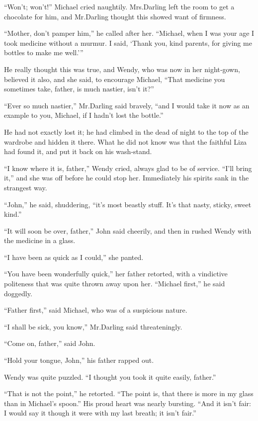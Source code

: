 “Won’t; won’t!\@” Michael cried naughtily.
Mrs.\@ Darling left the room to get a chocolate for him,
and Mr.\@ Darling thought this showed want of firmness.

“Mother, don’t pamper him,” he called after her.
“Michael, when I was your age I took medicine without a murmur.
I said, ‘Thank you, kind parents, for giving me bottles to make me well.’”

He really thought this was true,
and Wendy, who was now in her night‐gown, believed it also,
and she said, to encourage Michael,
“That medicine you sometimes take, father, is much nastier, isn’t it?”

“Ever so much nastier,” Mr.\@ Darling said bravely,
“and I would take it now as an example to you, Michael, if I hadn’t lost the bottle.”

He had not exactly lost it;
he had climbed in the dead of night to the top of the wardrobe and hidden it there.
What he did not know was that the faithful Liza had found it, and put it back on his wash‐stand.

“I know where it is, father,” Wendy cried, always glad to be of service.
“I’ll bring it,” and she was off before he could stop her.
Immediately his spirits sank in the strangest way.

“John,” he said, shuddering, “it’s most beastly stuff.
It’s that nasty, sticky, sweet kind.”

“It will soon be over, father,” John said cheerily,
and then in rushed Wendy with the medicine in a glass.

“I have been as quick as I could,” she panted.

“You have been wonderfully quick,” her father retorted,
with a vindictive politeness that was quite thrown away upon her.
“Michael first,” he said doggedly.

“Father first,” said Michael, who was of a suspicious nature.

“I shall be sick, you know,” Mr.\@ Darling said threateningly.

“Come on, father,” said John.

“Hold your tongue, John,” his father rapped out.

Wendy was quite puzzled.
“I thought you took it quite easily, father.”

“That is not the point,” he retorted.
“The point is, that there is more in my glass than in Michael’s spoon.”
His proud heart was nearly bursting.
“And it isn’t fair:
I would say it though it were with my last breath;
it isn’t fair.”


